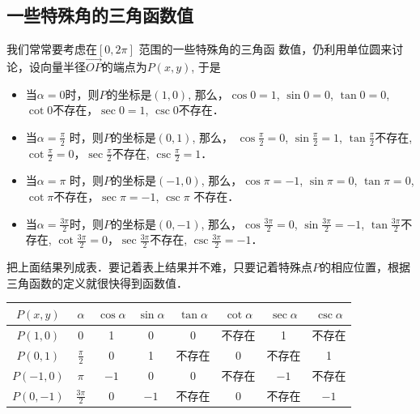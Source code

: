 \subsection{一些特殊角的三角函数值}
我们常常要考虑在$[0,2\pi]$ 范围的一些特殊角的三角函
数值，仍利用单位圆来讨论，设向量半径$\Vec{OP}$的端点为$P(x,y)$, 于是
\begin{itemize}
    \item 当$\alpha =0$时，则$P$的坐标是$(1,0)$, 那么，$\cos0=1$, 
$\sin0=0$, $\tan0=0$, $\cot0$不存在，$\sec 0=1$, $\csc0$不存在．
\item 当$\alpha =\frac{\pi}{2}$
时，则$P$的坐标是$(0,1)$, 那么，
$\cos\frac{\pi}{2}=0$, 
$\sin\frac{\pi}{2}=1$, $\tan\frac{\pi}{2}$不存在, $\cot\frac{\pi}{2}=0$，$\sec \frac{\pi}{2}$不存在, $\csc\frac{\pi}{2}=1$．

\item 当$\alpha =\pi$ 时，则$P$的坐标是$(-1,0)$, 那么，$\cos\pi =-1$, $\sin\pi =0$, $\tan\pi =0$, $\cot\pi$不存在，$\sec \pi =-1$, $\csc\pi$ 不存在．
\item 当$\alpha=\frac{3\pi}{2}$时，则$P$的坐标是$(0,-1)$, 那么，$\cos\frac{3\pi}{2}=0$, 
$\sin\frac{3\pi}{2}=-1$, $\tan\frac{3\pi}{2}$不存在, $\cot\frac{3\pi}{2}=0$，$\sec \frac{3\pi}{2}$不存在, $\csc\frac{3\pi}{2}=-1$．
\end{itemize}

把上面结果列成表．要记着表上结果并不难，只要记着特殊点$P$的相应位置，根据三角函数的定义就很快得到函数值．
\begin{center}
\begin{tabular}{c|c|cccccc}
\hline
$P(x,y)$ & $\alpha$& $\cos\alpha$& $\sin\alpha$& $\tan\alpha$& $\cot\alpha$& $\sec\alpha$& $\csc\alpha$\\
\hline
$P(1,0)$  &0&1&0&0&不存在&1&不存在\\
$P(0,1)$ &$\frac{\pi}{2}$&0&1&不存在&0&不存在&1\\
$P(-1,0)$ &$\pi$&$-1$&0&0&不存在&$-1$&不存在\\
$P(0,-1)$ &$\frac{3\pi}{2}$&0&$-1$&不存在&0&不存在&$-1$\\
\hline
\end{tabular}
\end{center}


